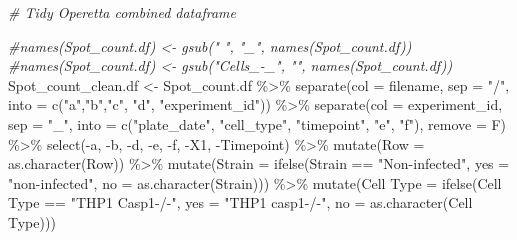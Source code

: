 \documentclass[
]{article}
\newenvironment{Shaded}{\begin{snugshade}}{\end{snugshade}}
\newcommand{\AttributeTok}[1]{\textcolor[rgb]{0.77,0.63,0.00}{#1}}
\newcommand{\CommentTok}[1]{\textcolor[rgb]{0.56,0.35,0.01}{\textit{#1}}}
\newcommand{\FunctionTok}[1]{\textcolor[rgb]{0.00,0.00,0.00}{#1}}
\newcommand{\NormalTok}[1]{#1}
\newcommand{\OtherTok}[1]{\textcolor[rgb]{0.56,0.35,0.01}{#1}}
\newcommand{\SpecialCharTok}[1]{\textcolor[rgb]{0.00,0.00,0.00}{#1}}
\newcommand{\StringTok}[1]{\textcolor[rgb]{0.31,0.60,0.02}{#1}}
\begin{document}
\begin{Shaded}
\begin{Highlighting}[]
\CommentTok{\# Tidy Operetta combined dataframe}

\CommentTok{\#names(Spot\_count.df) \textless{}{-} gsub(" ", "\_", names(Spot\_count.df))}
\CommentTok{\#names(Spot\_count.df) \textless{}{-} gsub("Cells\_{-}\_", "", names(Spot\_count.df))}
\NormalTok{Spot\_count\_clean.df }\OtherTok{\textless{}{-}}\NormalTok{ Spot\_count.df }\SpecialCharTok{\%\textgreater{}\%}
  \FunctionTok{separate}\NormalTok{(}\AttributeTok{col =}\NormalTok{ filename, }\AttributeTok{sep =} \StringTok{"/"}\NormalTok{, }\AttributeTok{into =} \FunctionTok{c}\NormalTok{(}\StringTok{"a"}\NormalTok{,}\StringTok{"b"}\NormalTok{,}\StringTok{"c"}\NormalTok{, }\StringTok{"d"}\NormalTok{, }\StringTok{"experiment\_id"}\NormalTok{)) }\SpecialCharTok{\%\textgreater{}\%}
  \FunctionTok{separate}\NormalTok{(}\AttributeTok{col =}\NormalTok{ experiment\_id, }\AttributeTok{sep =} \StringTok{"\_"}\NormalTok{, }\AttributeTok{into =} \FunctionTok{c}\NormalTok{(}\StringTok{"plate\_date"}\NormalTok{, }\StringTok{"cell\_type"}\NormalTok{, }\StringTok{"timepoint"}\NormalTok{, }\StringTok{"e"}\NormalTok{, }\StringTok{"f"}\NormalTok{), }\AttributeTok{remove =}\NormalTok{ F) }\SpecialCharTok{\%\textgreater{}\%}
  \FunctionTok{select}\NormalTok{(}\SpecialCharTok{{-}}\NormalTok{a, }\SpecialCharTok{{-}}\NormalTok{b, }\SpecialCharTok{{-}}\NormalTok{d, }\SpecialCharTok{{-}}\NormalTok{e, }\SpecialCharTok{{-}}\NormalTok{f, }\SpecialCharTok{{-}}\NormalTok{X1, }\SpecialCharTok{{-}}\NormalTok{Timepoint) }\SpecialCharTok{\%\textgreater{}\%}
  \FunctionTok{mutate}\NormalTok{(}\AttributeTok{Row =} \FunctionTok{as.character}\NormalTok{(Row)) }\SpecialCharTok{\%\textgreater{}\%}
  \FunctionTok{mutate}\NormalTok{(}\AttributeTok{Strain =} \FunctionTok{ifelse}\NormalTok{(Strain }\SpecialCharTok{==} \StringTok{"Non{-}infected"}\NormalTok{, }\AttributeTok{yes =} \StringTok{"non{-}infected"}\NormalTok{, }\AttributeTok{no =} \FunctionTok{as.character}\NormalTok{(Strain))) }\SpecialCharTok{\%\textgreater{}\%}
  \FunctionTok{mutate}\NormalTok{(}\StringTok{\textasciigrave{}}\AttributeTok{Cell Type}\StringTok{\textasciigrave{}} \OtherTok{=} \FunctionTok{ifelse}\NormalTok{(}\StringTok{\textasciigrave{}}\AttributeTok{Cell Type}\StringTok{\textasciigrave{}} \SpecialCharTok{==} \StringTok{"THP1 Casp1{-}/{-}"}\NormalTok{, }\AttributeTok{yes =} \StringTok{"THP1 casp1{-}/{-}"}\NormalTok{, }\AttributeTok{no =} \FunctionTok{as.character}\NormalTok{(}\StringTok{\textasciigrave{}}\AttributeTok{Cell Type}\StringTok{\textasciigrave{}}\NormalTok{))) }
  


\end{Highlighting}
\end{Shaded}
\end{document}
